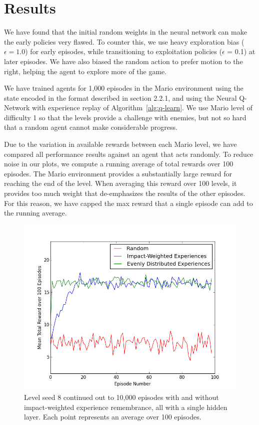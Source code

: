 \documentclass{article}
\begin{document}
 \section{Results}
 
We have found that the initial random weights in the neural network can make the early policies very flawed. To counter this, we use heavy exploration bias ($\epsilon = 1.0$) for early episodes, while transitioning to exploitation policies ($\epsilon$ = 0.1) at later episodes. We have also biased the random action to prefer motion to the right, helping the agent to explore more of the game. 

We have trained agents for 1,000 episodes in the Mario environment using the state encoded in the format described in section 2.2.1, and using the Neural Q-Network with experience replay of Algorithm~\ref{alg:q-learn}. We use Mario level of difficulty 1 so that the levels provide a challenge with enemies, but not so hard that a random agent cannot make considerable progress.
 
Due to the variation in available rewards between each Mario level, we have compared all performance results against an agent that acts randomly. To reduce noise in our plots, we compute a running average of total rewards over 100 episodes. The Mario environment provides a substantially large reward for reaching the end of the level. When averaging this reward over 100 levels, it provides too much weight that de-emphasizes the results of the other episodes. For this reason, we have capped the max reward that a single episode can add to the running average.
 
 \begin{figure}
 \begin{center}
 \includegraphics[scale=0.42]{10000epsSeed8.png}
\caption{Level seed 8 continued out to 10,000 episodes with and without impact-weighted experience remembrance, all with a single hidden layer. Each point represents an average over 100 episodes.}
 \end{center}
 \end{figure}
 
\end{document}
